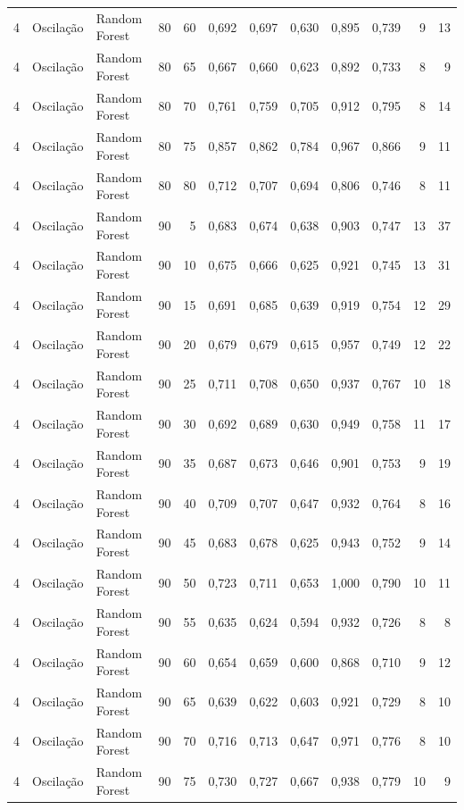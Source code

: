 \begin{longtable}{@{}rllrrrrrrrrr@{}}
4 & Oscilação & Random Forest & 80 & 60 & 0,692 & 0,697 & 0,630 & 0,895 & 0,739 & 9 & 13 \\
4 & Oscilação & Random Forest & 80 & 65 & 0,667 & 0,660 & 0,623 & 0,892 & 0,733 & 8 & 9 \\
4 & Oscilação & Random Forest & 80 & 70 & 0,761 & 0,759 & 0,705 & 0,912 & 0,795 & 8 & 14 \\
4 & Oscilação & Random Forest & 80 & 75 & 0,857 & 0,862 & 0,784 & 0,967 & 0,866 & 9 & 11 \\
4 & Oscilação & Random Forest & 80 & 80 & 0,712 & 0,707 & 0,694 & 0,806 & 0,746 & 8 & 11 \\
4 & Oscilação & Random Forest & 90 & 5 & 0,683 & 0,674 & 0,638 & 0,903 & 0,747 & 13 & 37 \\
4 & Oscilação & Random Forest & 90 & 10 & 0,675 & 0,666 & 0,625 & 0,921 & 0,745 & 13 & 31 \\
4 & Oscilação & Random Forest & 90 & 15 & 0,691 & 0,685 & 0,639 & 0,919 & 0,754 & 12 & 29 \\
4 & Oscilação & Random Forest & 90 & 20 & 0,679 & 0,679 & 0,615 & 0,957 & 0,749 & 12 & 22 \\
4 & Oscilação & Random Forest & 90 & 25 & 0,711 & 0,708 & 0,650 & 0,937 & 0,767 & 10 & 18 \\
4 & Oscilação & Random Forest & 90 & 30 & 0,692 & 0,689 & 0,630 & 0,949 & 0,758 & 11 & 17 \\
4 & Oscilação & Random Forest & 90 & 35 & 0,687 & 0,673 & 0,646 & 0,901 & 0,753 & 9 & 19 \\
4 & Oscilação & Random Forest & 90 & 40 & 0,709 & 0,707 & 0,647 & 0,932 & 0,764 & 8 & 16 \\
4 & Oscilação & Random Forest & 90 & 45 & 0,683 & 0,678 & 0,625 & 0,943 & 0,752 & 9 & 14 \\
4 & Oscilação & Random Forest & 90 & 50 & 0,723 & 0,711 & 0,653 & 1,000 & 0,790 & 10 & 11 \\
4 & Oscilação & Random Forest & 90 & 55 & 0,635 & 0,624 & 0,594 & 0,932 & 0,726 & 8 & 8 \\
4 & Oscilação & Random Forest & 90 & 60 & 0,654 & 0,659 & 0,600 & 0,868 & 0,710 & 9 & 12 \\
4 & Oscilação & Random Forest & 90 & 65 & 0,639 & 0,622 & 0,603 & 0,921 & 0,729 & 8 & 10 \\
4 & Oscilação & Random Forest & 90 & 70 & 0,716 & 0,713 & 0,647 & 0,971 & 0,776 & 8 & 10 \\
4 & Oscilação & Random Forest & 90 & 75 & 0,730 & 0,727 & 0,667 & 0,938 & 0,779 & 10 & 9 \\

\end{longtable}
